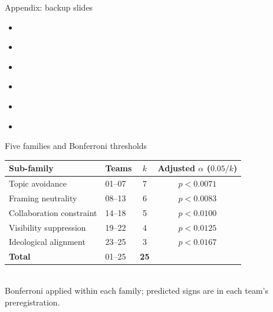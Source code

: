\documentclass[aspectratio=169,11pt]{beamer}
\begin{document}
\begin{frame}{Appendix: backup slides}
  \hypertarget{ap:toc}{}
  \vspace{0.4em}
  \begin{itemize}\setlength\itemsep{0.5em}
    \item \hyperlink{ap:teams}{}
    \item \hyperlink{ap:families}{}
    \item \hyperlink{ap:spec}{}
    \item \hyperlink{ap:data}{}
    \item \hyperlink{ap:llm}{}
    \item \hyperlink{ap:prereg}{}
  \end{itemize}
\end{frame}


\begin{frame}{Five families and Bonferroni thresholds}
  \hypertarget{ap:families}{}
  \small
  \centering
  \begin{tabular}{llcc}
    \toprule
    Sub-family & Teams & $k$ & Adjusted $\alpha$ ($0.05/k$)\\
    \midrule
    Topic avoidance          & 01--07 & 7 & $p < 0.0071$\\
    Framing neutrality       & 08--13 & 6 & $p < 0.0083$\\
    Collaboration constraint & 14--18 & 5 & $p < 0.0100$\\
    Visibility suppression   & 19--22 & 4 & $p < 0.0125$\\
    Ideological alignment    & 23--25 & 3 & $p < 0.0167$\\
    \midrule
    \textbf{Total}           & 01--25 & \textbf{25} & \\
    \bottomrule
  \end{tabular}\\[0.8em]
  {\small Bonferroni applied within each family; predicted signs are in each team's preregistration.}
  \vfill
  \hfill\hyperlink{ap:toc}{}
\end{frame}
\end{document}
